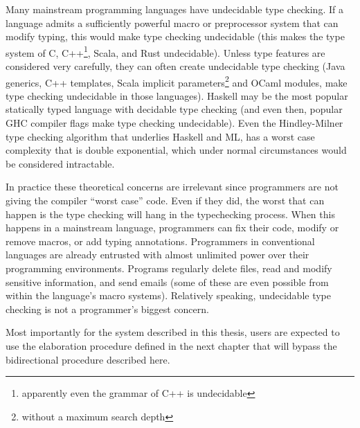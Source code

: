 
Many mainstream programming languages have undecidable type checking.
If a language admits a sufficiently powerful macro or preprocessor system that can modify typing, this would make type checking undecidable (this makes the type system of C, C++\footnote{apparently even the grammar of C++ is undecidable}, Scala, and Rust undecidable).
Unless type features are considered very carefully, they can often create undecidable type checking (Java generics, C++ templates, Scala implicit parameters\footnote{without a maximum search depth} and OCaml modules, make type checking undecidable in those languages).
Haskell may be the most popular statically typed language with decidable type checking (and even then, popular GHC compiler flags make type checking undecidable).
Even the Hindley-Milner type checking algorithm that underlies Haskell and ML, has a worst case complexity that is double exponential, which under normal circumstances would be considered intractable.

In practice these theoretical concerns are irrelevant since programmers are not giving the compiler ``worst case'' code.
Even if they did, the worst that can happen is the type checking will hang in the typechecking process.
When this happens in a mainstream language, programmers can fix their code, modify or remove macros, or add typing annotations.
Programmers in conventional languages are already entrusted with almost unlimited power over their programming environments.
Programs regularly delete files, read and modify sensitive information, and send emails (some of these are even possible from within the language's macro systems).
Relatively speaking, undecidable type checking is not a programmer's biggest concern.

Most importantly for the system described in this thesis, users are expected to use the elaboration procedure defined in the next chapter that will bypass the bidirectional procedure described here.
